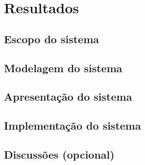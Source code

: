 
\chapter{Resultados}\label{cap:resultados}

\section{Escopo do sistema}\label{sec:escopoSistema}

\section{Modelagem do sistema}\label{sec:modelagemSistema}

\section{Apresentação do sistema}\label{sec:apresentacaoSistema}

\section{Implementação do sistema}\label{sec:implementacaoSistema}

\section{Discussões (opcional)}\label{sec:discussoes} 
